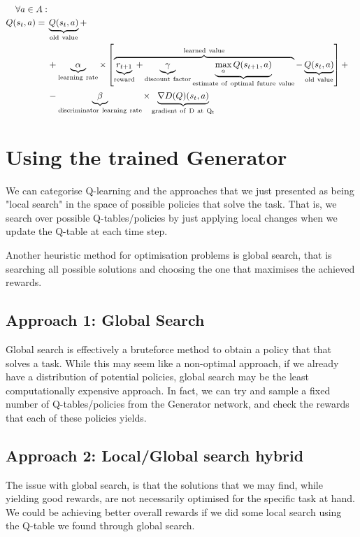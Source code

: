 \begin{equation}
\begin{aligned}
  \forall a \in A: \\
  Q(s_{t},a) ={} &\underbrace{Q(s_t,a)}_{\rm old~value} + \\
  & + \underbrace{\alpha}_{\rm learning~rate} \times \left[
    \overbrace{\underbrace{r_{t+1}}_{\rm reward} + \underbrace{\gamma}_{\rm
        discount~factor} \underbrace{\max_{a}Q(s_{t+1}, a)}_{\rm
        estimate~of~optimal~future~value}}^{\rm learned~value} - \underbrace{Q(s_t,a)}_{\rm old~value} \right] + \\
   & - \underbrace{\beta}_{\rm discriminator~learning~rate} \times \underbrace{\nabla D(Q)(s_{t}, a)}_{\rm gradient~of~D~at~Q_{t}}
\end{aligned}
\end{equation}



\section{Using the trained Generator}
We can categorise Q-learning and the approaches that we just presented as being "local search" in the space of possible policies that solve the task. That is, we search over possible Q-tables/policies by just applying local changes when we update the Q-table at each time step.

Another heuristic method for optimisation problems is global search, that is searching all possible solutions and choosing the one that maximises the achieved rewards.

\subsection{Approach 1: Global Search}
\label{ssec:globalsearch}
Global search is effectively a bruteforce method to obtain a policy that 
that solves a task. While this may seem like a non-optimal approach, if we already have a distribution of potential policies, global search may be the least computationally expensive approach.
In fact, we can try and sample a fixed number of Q-tables/policies from the Generator network, and check the rewards that each of these policies yields.

\subsection{Approach 2: Local/Global search hybrid}
\label{ssec:localglobalsearch}
The issue with global search, is that the solutions that we may find, while yielding good rewards, are not necessarily optimised for the specific task at hand. We could be achieving better overall rewards if we did some local search using the Q-table we found through global search.

